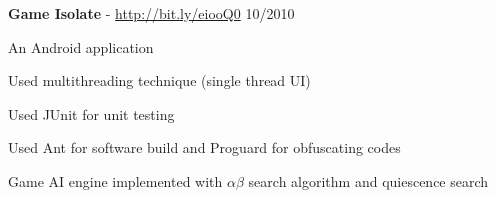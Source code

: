 \documentclass[margin,line]{resume}
\begin{document}
\begin{resume}
    \textbf{Game Isolate} - \url{http://bit.ly/eiooQ0} \hfill 10/2010 \vspace{-3mm}\\\vspace{-1mm}%
      \begin{list2}
       \item An Android application
       \item Used multithreading technique (single thread UI)
       \item Used JUnit for unit testing
       \item Used Ant for software build and Proguard for obfuscating codes
       \item Game AI engine implemented with $\alpha \beta$ search algorithm and quiescence search
      \end{list2}
\end{resume}
\end{document}

